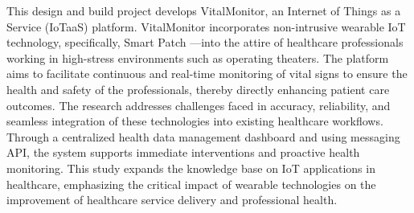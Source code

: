 
This design and build project develops VitalMonitor, an Internet of Things as a Service (IoTaaS) platform. VitalMonitor incorporates non-intrusive wearable IoT technology, specifically, Smart Patch —into the attire of healthcare professionals working in high-stress environments such as operating theaters. The platform aims to facilitate continuous and real-time monitoring of vital signs to ensure the health and safety of the professionals, thereby directly enhancing patient care outcomes. The research addresses challenges faced in accuracy, reliability, and seamless integration of these technologies into existing healthcare workflows. Through a centralized health data management dashboard and using messaging API, the system supports immediate interventions and proactive health monitoring. This study expands the knowledge base on IoT applications in healthcare, emphasizing the critical impact of wearable technologies on the improvement of healthcare service delivery and professional health.